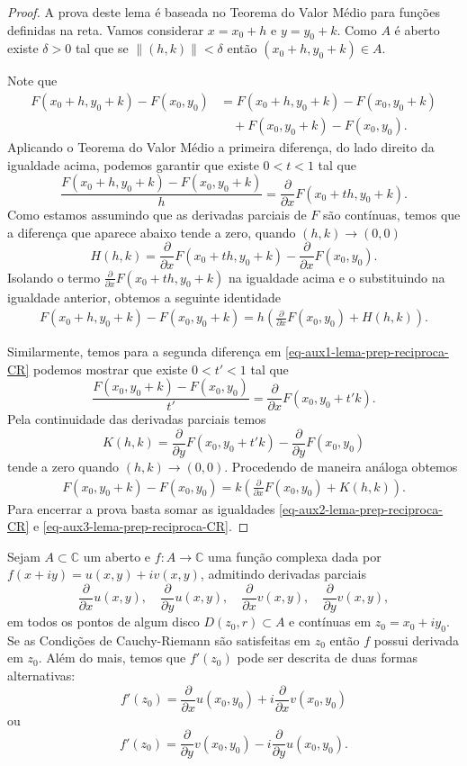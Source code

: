 \begin{proof}
A prova deste lema é baseada no Teorema do Valor Médio para funções definidas na reta.
Vamos considerar $x=x_0+h$ e $y=y_0+k$. Como $A$ é aberto existe $\delta>0$ tal que 
se $\|(h,k)\|<\delta$ então $(x_0+h,y_0+k)\in A$. 

Note que 
\begin{align}\label{eq-aux1-lema-prep-reciproca-CR}
F(x_0+h,y_0+k) -F(x_0,y_0) 
&= 
F(x_0+h,y_0+k)-F(x_0,y_0+k) 
\nonumber \\
&\quad + F(x_0,y_0+k)-F(x_0,y_0).
\end{align}
Aplicando o Teorema do Valor Médio a primeira diferença, do lado direito da igualdade acima, podemos
garantir que existe $0<t<1$ tal que 
\[
\frac{F(x_0+h,y_0+k)-F(x_0,y_0+k)}{h} = \frac{\partial }{\partial x}F(x_0+th,y_0+k).
\]
Como estamos assumindo que as derivadas parciais de $F$ são contínuas, temos que 
a diferença que aparece abaixo tende a zero, quando $(h,k)\to (0,0)$
\[
H(h,k) = \frac{\partial}{\partial x}F(x_0+th,y_0+k)-\frac{\partial}{\partial x}F(x_0,y_0).
\]
Isolando o termo $\frac{\partial}{\partial x}F(x_0+th,y_0+k)$ na igualdade acima 
e o substituindo na igualdade anterior, obtemos a seguinte identidade
\begin{align}\label{eq-aux2-lema-prep-reciproca-CR}
F(x_0+h,y_0+k)-F(x_0,y_0+k) = h \left( \frac{\partial}{\partial x}F(x_0,y_0) + H(h,k)  \right).
\end{align}

Similarmente, temos para a segunda diferença em \eqref{eq-aux1-lema-prep-reciproca-CR}
podemos mostrar que existe $0<t'<1$ tal que
\[
\frac{F(x_0,y_0+k)-F(x_0,y_0)}{t'}
=
\frac{\partial }{\partial x}F(x_0,y_0+t'k).
\]
Pela continuidade das derivadas parciais temos  
\[
K(h,k) = \frac{\partial }{\partial y}F(x_0,y_0+t'k)-\frac{\partial}{\partial y}F(x_0,y_0)
\]
tende a zero quando $(h,k)\to (0,0)$. Procedendo de maneira análoga obtemos 
\begin{align}\label{eq-aux3-lema-prep-reciproca-CR}
F(x_0,y_0+k)-F(x_0,y_0) = k\left( \frac{\partial }{\partial x}F(x_0,y_0) + K(h,k)  \right).
\end{align}
Para encerrar a prova basta somar as igualdades 
\eqref{eq-aux2-lema-prep-reciproca-CR} e \eqref{eq-aux3-lema-prep-reciproca-CR}.
\end{proof}


\begin{proposicao}\label{prop-reciproca-CR}
Sejam $A\subset\mathbb{C}$ um aberto e $f:A\to\mathbb{C}$ uma função complexa
dada por $f(x+iy)=u(x,y)+iv(x,y)$, admitindo derivadas parciais 
\[
\frac{\partial }{\partial x}u(x,y),\quad 
\frac{\partial }{\partial y}u(x,y),\quad 
\frac{\partial }{\partial x}v(x,y),\quad 
\frac{\partial }{\partial y}v(x,y),
\]
em todos os pontos de algum disco $D(z_0,r)\subset A$ e contínuas em $z_0=x_0+iy_0$.
Se as Condições de Cauchy-Riemann são satisfeitas em $z_0$ então $f$ possui derivada em $z_0$.
Além do mais, temos que $f'(z_0)$ pode ser descrita de duas formas alternativas:
\[
f'(z_0) 
=
\frac{\partial}{\partial x}u(x_0,y_0) +i \frac{\partial}{\partial x}v(x_0,y_0) 
\]
ou
\[
f'(z_0)
=
\frac{\partial }{\partial y}v(x_0,y_0) -i \frac{\partial }{\partial y}u(x_0,y_0).
\]
\end{proposicao}

